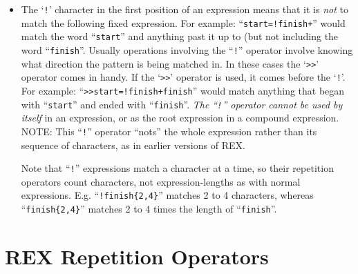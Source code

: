 \begin{itemize}
\item  The `\verb`!`' character in the first position of an expression means
       that it is {\em not} to match the following fixed expression.
       For example: ``\verb`start=!finish+`'' would match the word ``\verb`start`''
       and anything past it up to (but not including the word ``\verb`finish`''.
       Usually operations involving the ``\verb`!`'' operator involve knowing
       what direction the pattern is being matched in. In these cases
       the `\verb`>>`' operator comes in handy. If the `\verb`>>`' operator is
       used, it comes before the `\verb`!`'. For example:
       ``\verb`>>start=!finish+finish`'' would match anything that began
       with ``\verb`start`'' and ended with ``\verb`finish`''.  {\em The ``\verb`!`''
       operator cannot be used by itself} in an expression, or as the root
       expression in a compound expression.  NOTE:  This ``\verb`!`'' operator
       ``nots'' the whole expression rather than its sequence of characters,
       as in earlier versions of REX.

       Note that ``\verb`!`'' expressions match a character at a time,
       so their repetition operators count characters, not
       expression-lengths as with normal expressions.
       E.g. ``\verb`!finish{2,4}`'' matches 2 to 4 characters, whereas
       ``\verb`finish{2,4}`'' matches 2 to 4 times the length of
       ``\verb`finish`''.

\end{itemize}

\section{REX Repetition Operators}


